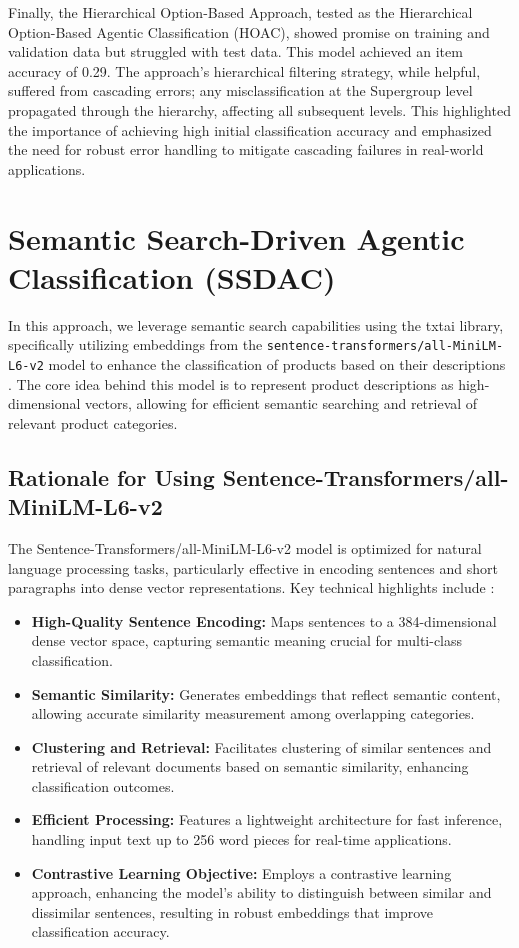 \documentclass[9pt,a4paper,twoside]{rho-class/rho}
\begin{document}
Finally, the Hierarchical Option-Based Approach, tested as the Hierarchical Option-Based Agentic Classification (HOAC), showed promise on training and validation data but struggled with test data. This model achieved an item accuracy of 0.29. The approach’s hierarchical filtering strategy, while helpful, suffered from cascading errors; any misclassification at the Supergroup level propagated through the hierarchy, affecting all subsequent levels. This highlighted the importance of achieving high initial classification accuracy and emphasized the need for robust error handling to mitigate cascading failures in real-world applications.

\section{Semantic Search-Driven Agentic Classification (SSDAC)}
    In this approach, we leverage semantic search capabilities using the txtai library, specifically utilizing embeddings from the \texttt{sentence-transformers/all-MiniLM-L6-v2} model to enhance the classification of products based on their descriptions \cite{Mezzetti_txtai_the_all-in-one_2020}. The core idea behind this model is to represent product descriptions as high-dimensional vectors, allowing for efficient semantic searching and retrieval of relevant product categories.

    \subsection{Rationale for Using Sentence-Transformers/all-MiniLM-L6-v2}
    The Sentence-Transformers/all-MiniLM-L6-v2 model is optimized for natural language processing tasks, particularly effective in encoding sentences and short paragraphs into dense vector representations. Key technical highlights include \cite{yin2024study}:
    
    \begin{itemize}
        \item \textbf{High-Quality Sentence Encoding:} Maps sentences to a 384-dimensional dense vector space, capturing semantic meaning crucial for multi-class classification.
        \item \textbf{Semantic Similarity:} Generates embeddings that reflect semantic content, allowing accurate similarity measurement among overlapping categories.
        \item \textbf{Clustering and Retrieval:} Facilitates clustering of similar sentences and retrieval of relevant documents based on semantic similarity, enhancing classification outcomes.
        \item \textbf{Efficient Processing:} Features a lightweight architecture for fast inference, handling input text up to 256 word pieces for real-time applications.
        \item \textbf{Contrastive Learning Objective:} Employs a contrastive learning approach, enhancing the model's ability to distinguish between similar and dissimilar sentences, resulting in robust embeddings that improve classification accuracy.
    \end{itemize}
    
\end{document}
